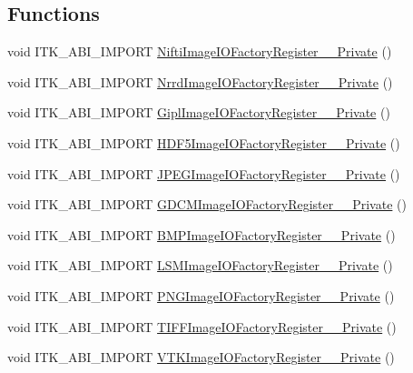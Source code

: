 \subsection*{Functions}
\begin{DoxyCompactItemize}
\item 
void I\+T\+K\+\_\+\+A\+B\+I\+\_\+\+I\+M\+P\+O\+RT \hyperlink{namespaceitk_a69c1eb078886742b68c35e9f0d6b2b1b}{Nifti\+Image\+I\+O\+Factory\+Register\+\_\+\+\_\+\+Private} ()
\item 
void I\+T\+K\+\_\+\+A\+B\+I\+\_\+\+I\+M\+P\+O\+RT \hyperlink{namespaceitk_afc296df09bcbadc4b3ce7d9d165dcc69}{Nrrd\+Image\+I\+O\+Factory\+Register\+\_\+\+\_\+\+Private} ()
\item 
void I\+T\+K\+\_\+\+A\+B\+I\+\_\+\+I\+M\+P\+O\+RT \hyperlink{namespaceitk_a78d16bca2dd3d205e71ec4d5689c833f}{Gipl\+Image\+I\+O\+Factory\+Register\+\_\+\+\_\+\+Private} ()
\item 
void I\+T\+K\+\_\+\+A\+B\+I\+\_\+\+I\+M\+P\+O\+RT \hyperlink{namespaceitk_afa390690b56ebd0c23ed43fac398d907}{H\+D\+F5\+Image\+I\+O\+Factory\+Register\+\_\+\+\_\+\+Private} ()
\item 
void I\+T\+K\+\_\+\+A\+B\+I\+\_\+\+I\+M\+P\+O\+RT \hyperlink{namespaceitk_a3bd30ac9124db8f3a6f2f306c19efed7}{J\+P\+E\+G\+Image\+I\+O\+Factory\+Register\+\_\+\+\_\+\+Private} ()
\item 
void I\+T\+K\+\_\+\+A\+B\+I\+\_\+\+I\+M\+P\+O\+RT \hyperlink{namespaceitk_ac11d936fecf456be40813530a5f2131b}{G\+D\+C\+M\+Image\+I\+O\+Factory\+Register\+\_\+\+\_\+\+Private} ()
\item 
void I\+T\+K\+\_\+\+A\+B\+I\+\_\+\+I\+M\+P\+O\+RT \hyperlink{namespaceitk_a87d8c64466d88ef9b019eb62b1f8c9c0}{B\+M\+P\+Image\+I\+O\+Factory\+Register\+\_\+\+\_\+\+Private} ()
\item 
void I\+T\+K\+\_\+\+A\+B\+I\+\_\+\+I\+M\+P\+O\+RT \hyperlink{namespaceitk_ac720f79ac7220f272702417af309df77}{L\+S\+M\+Image\+I\+O\+Factory\+Register\+\_\+\+\_\+\+Private} ()
\item 
void I\+T\+K\+\_\+\+A\+B\+I\+\_\+\+I\+M\+P\+O\+RT \hyperlink{namespaceitk_a7b3edf1df65db44a32e7d04b6a2d708b}{P\+N\+G\+Image\+I\+O\+Factory\+Register\+\_\+\+\_\+\+Private} ()
\item 
void I\+T\+K\+\_\+\+A\+B\+I\+\_\+\+I\+M\+P\+O\+RT \hyperlink{namespaceitk_ac955babfef441b9e6594b25af5eaa960}{T\+I\+F\+F\+Image\+I\+O\+Factory\+Register\+\_\+\+\_\+\+Private} ()
\item 
void I\+T\+K\+\_\+\+A\+B\+I\+\_\+\+I\+M\+P\+O\+RT \hyperlink{namespaceitk_af15d0da6fcd3947619f8effacddde579}{V\+T\+K\+Image\+I\+O\+Factory\+Register\+\_\+\+\_\+\+Private} ()

\end{DoxyCompactItemize}
